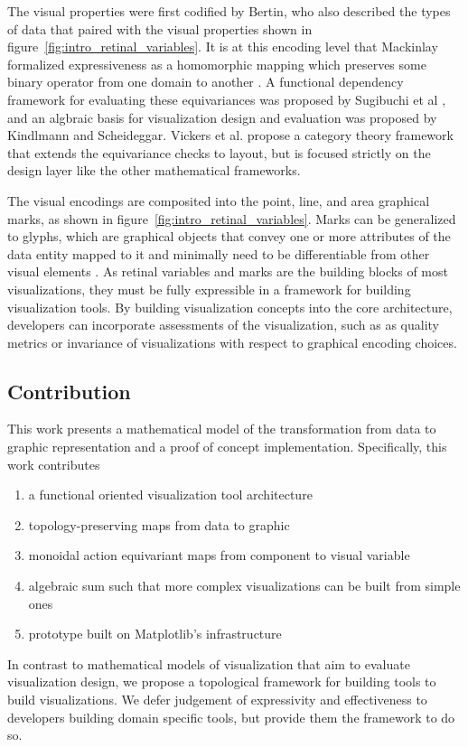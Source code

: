 \documentclass[../main.tex]{subfiles}
\begin{document}
The visual properties were first codified by Bertin\cite{bertinSemiologyGraphicsDiagrams2011a}, who also described the types of data that paired with the visual properties shown in figure~\ref{fig:intro_retinal_variables}. It is at this encoding level that Mackinlay formalized expressiveness as a homomorphic mapping which preserves some binary operator from one domain to another \cite{mackinlayAUTOMATICDESIGNGRAPHICAL1987}. A functional dependency framework for evaluating these equivariances was proposed by Sugibuchi et al \cite{sugibuchiFramwork2009}, and an algbraic basis for visualization design and evaluation was proposed by Kindlmann and Scheideggar\cite{kindlmann2014algebraic}. Vickers et al. propose a category theory framework\cite{vickersUnderstandingViz2013} that extends the equivariance checks to layout, but is focused strictly on the design layer like the other mathematical frameworks. 

The visual encodings are composited into the point, line, and area graphical marks, as shown in figure~\ref{fig:intro_retinal_variables}. Marks can be generalized to glyphs, which are graphical objects that convey one or more attributes of the data entity mapped to it\cite{ware2019information, munznerVisualizationAnalysisDesign2014} and minimally need to be differentiable from other visual elements \cite{ziemkiewiczEmbeddingInformationVisualization2009}. As retinal variables and marks are the building blocks of most visualizations, they must be fully expressible in a framework for building visualization tools. By building visualization concepts into the core architecture, developers can incorporate assessments of the visualization,  such as as quality metrics\cite{bertiniQualityMetricsHighdimensional2011a} or invariance \cite{kindlmann2014algebraic} of visualizations with respect to graphical encoding choices.  

\subsection{Contribution}
This work presents a mathematical model of the transformation from data to graphic representation and a proof of concept implementation. Specifically, this work contributes

\begin{enumerate}
    \item a functional oriented visualization tool architecture
    \item topology-preserving maps from data to graphic 
    \item monoidal action equivariant maps from component to visual variable 
    \item algebraic sum such that more complex visualizations can be built from simple ones 
    \item prototype built on Matplotlib's infrastructure
\end{enumerate}
In contrast to mathematical models of visualization that aim to evaluate visualization design, we propose a topological framework for building tools to build visualizations. We defer judgement of expressivity and effectiveness to developers building domain specific tools, but provide them the framework to do so. 
\end{document}
